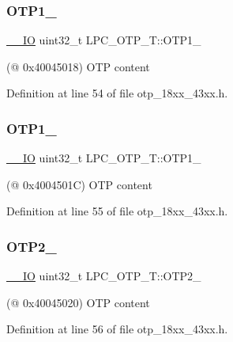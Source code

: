 \subsubsection{\texorpdfstring{O\+T\+P1\+\_}{OTP1\_2}}
{\footnotesize\ttfamily \hyperlink{core__sc300_8h_aec43007d9998a0a0e01faede4133d6be}{\+\_\+\+\_\+\+IO} uint32\+\_\+t L\+P\+C\+\_\+\+O\+T\+P\+\_\+\+T\+::\+O\+T\+P1\+\_}

(@ 0x40045018) O\+TP content 

Definition at line 54 of file otp\+\_\+18xx\+\_\+43xx.\+h.

\mbox{\label{struct_l_p_c___o_t_p___t_a32d477cca8a5c23290aa682669fd940e}} 
\subsubsection{\texorpdfstring{O\+T\+P1\+\_}{OTP1\_3}}
{\footnotesize\ttfamily \hyperlink{core__sc300_8h_aec43007d9998a0a0e01faede4133d6be}{\+\_\+\+\_\+\+IO} uint32\+\_\+t L\+P\+C\+\_\+\+O\+T\+P\+\_\+\+T\+::\+O\+T\+P1\+\_}

(@ 0x4004501C) O\+TP content 

Definition at line 55 of file otp\+\_\+18xx\+\_\+43xx.\+h.

\mbox{\label{struct_l_p_c___o_t_p___t_ad71d8faea7d74003e40691beba4577ab}} 
\subsubsection{\texorpdfstring{O\+T\+P2\+\_}{OTP2\_0}}
{\footnotesize\ttfamily \hyperlink{core__sc300_8h_aec43007d9998a0a0e01faede4133d6be}{\+\_\+\+\_\+\+IO} uint32\+\_\+t L\+P\+C\+\_\+\+O\+T\+P\+\_\+\+T\+::\+O\+T\+P2\+\_}

(@ 0x40045020) O\+TP content 

Definition at line 56 of file otp\+\_\+18xx\+\_\+43xx.\+h.

\mbox{\label{struct_l_p_c___o_t_p___t_a60436977035b0a112b2028aece0425e8}} 
